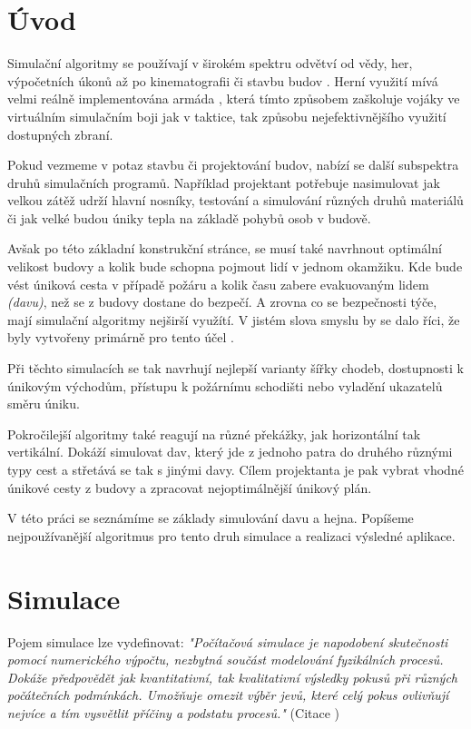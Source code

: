 \documentclass[czech,public,dept460,male,cpdeclaration]{diploma}
\begin{document}
\MakeTitlePages

\lstlistoflistings

\section{Úvod}
Simulační algoritmy se používají v širokém spektru odvětví od vědy, her, výpočetních úkonů až po kinematografii či stavbu budov \cite{linkToBuildingSimulation}. Herní využití mívá velmi reálně implementována armáda \cite{linkToArmySimulation}, která tímto způsobem zaškoluje vojáky ve virtuálním simulačním boji jak v taktice, tak způsobu nejefektivnějšího využití dostupných zbraní. 

Pokud vezmeme v potaz stavbu či projektování budov, nabízí se další subspektra  druhů simulačních programů. Například projektant potřebuje nasimulovat jak velkou zátěž udrží hlavní nosníky, testování a simulování různých druhů materiálů či jak velké budou úniky tepla na základě pohybů osob v budově.

Avšak po této základní konstrukční stránce, se musí také navrhnout optimální velikost budovy a kolik bude schopna pojmout lidí v jednom okamžiku. Kde bude vést úniková cesta v případě požáru a kolik času zabere evakuovaným lidem \textit{(davu)}, než se z budovy dostane do bezpečí. A zrovna co se bezpečnosti týče, mají simulační algoritmy nejširší využítí. V jistém slova smyslu by se dalo říci, že byly vytvořeny primárně pro tento účel \cite{link1}.

Při těchto simulacích se tak navrhují nejlepší varianty šířky chodeb, dostupnosti k únikovým východům, přístupu k požárnímu schodišti nebo vyladění ukazatelů směru
úniku.

Pokročilejší algoritmy také reagují na různé překážky, jak horizontální tak vertikální. Dokáží simulovat dav, který jde z jednoho patra do druhého různými typy cest a střetává se tak s jinými davy. Cílem projektanta je pak vybrat vhodné únikové cesty z budovy a zpracovat nejoptimálnější únikový plán.

V této práci se seznámíme se základy simulování davu a hejna. Popíšeme nejpoužívanější algoritmus \cite{link2} pro tento druh simulace a realizaci výsledné aplikace.

\section{Simulace}
Pojem simulace lze vydefinovat: \textit{"Počítačová simulace je napodobení skutečnosti pomocí numerického výpočtu, nezbytná součást modelování fyzikálních procesů. Dokáže předpovědět jak kvantitativní, tak kvalitativní výsledky pokusů při různých počátečních podmínkách. Umožňuje omezit výběr jevů, které celý pokus ovlivňují nejvíce a tím vysvětlit příčiny a podstatu procesů."} (Citace \cite{linkToSimulation})
\end{document}
